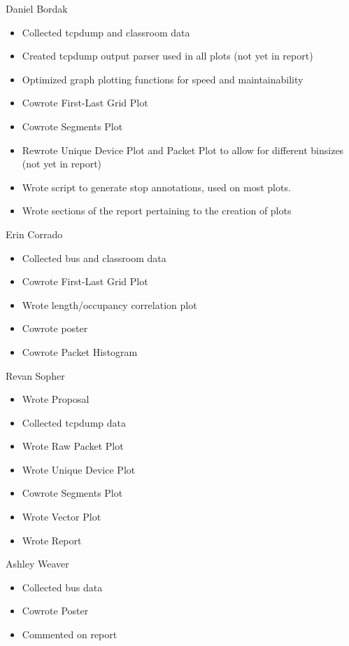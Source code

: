 \documentclass[12pt,journal,compsoc]{IEEEtran} %
\begin{document}
\clearpage

Daniel Bordak
\begin{itemize}
\item Collected tcpdump and classroom data
\item Created tcpdump output parser used in all plots (not yet in report)
\item Optimized graph plotting functions for speed and maintainability
\item Cowrote First-Last Grid Plot
\item Cowrote Segments Plot 
\item Rewrote Unique Device Plot and Packet Plot to allow for different binsizes (not yet in report)
\item Wrote script to generate stop annotations, used on most plots.
\item Wrote sections of the report pertaining to the creation of plots
\end{itemize}
Erin Corrado
\begin{itemize}
\item Collected bus and classroom data
\item Cowrote First-Last Grid Plot
\item Wrote length/occupancy correlation plot
\item Cowrote poster
\item Cowrote Packet Histogram
\end{itemize}
Revan Sopher
\begin{itemize}
\item Wrote Proposal
\item Collected tcpdump data
\item Wrote Raw Packet Plot
\item Wrote Unique Device Plot
\item Cowrote Segments Plot
\item Wrote Vector Plot
\item Wrote Report
\end{itemize}
Ashley Weaver
\begin{itemize}
\item Collected bus data
\item Cowrote Poster
\item Commented on report
\end{itemize}
\end{document}
